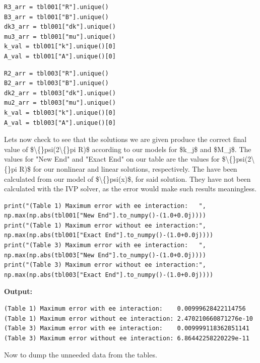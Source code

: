 \documentclass{article}
\begin{document}
\begin{lstlisting}
R3_arr = tbl001["R"].unique()
B3_arr = tbl001["B"].unique()
dk3_arr = tbl001["dk"].unique()
mu3_arr = tbl001["mu"].unique()
k_val = tbl001["k"].unique()[0]
A_val = tbl001["A"].unique()[0]\end{lstlisting}

\begin{lstlisting}
R2_arr = tbl003["R"].unique()
B2_arr = tbl003["B"].unique()
dk2_arr = tbl003["dk"].unique()
mu2_arr = tbl003["mu"].unique()
k_val = tbl003["k"].unique()[0]
A_val = tbl003["A"].unique()[0]\end{lstlisting}

Lets now check to see that the solutions we are given produce the correct final value of \$\textbackslash\{\}psi(2\textbackslash\{\}pi R)\$ according to our models for \$k\_j\$ and \$M\_j\$. The values for "New End" and "Exact End" on our table are the values for \$\textbackslash\{\}psi(2\textbackslash\{\}pi R)\$ for our nonlinear and linear solutions, respectively. The have been calculated from our model of \$\textbackslash\{\}psi(x)\$, for said solution. They have not been calculated with the IVP solver, as the error would make such results meaningless. 

\begin{lstlisting}
print("(Table 1) Maximum error with ee interaction:   ", np.max(np.abs(tbl001["New End"].to_numpy()-(1.0+0.0j))))
print("(Table 1) Maximum error without ee interaction:", np.max(np.abs(tbl001["Exact End"].to_numpy()-(1.0+0.0j))))
print("(Table 3) Maximum error with ee interaction:   ", np.max(np.abs(tbl003["New End"].to_numpy()-(1.0+0.0j))))
print("(Table 3) Maximum error without ee interaction:", np.max(np.abs(tbl003["Exact End"].to_numpy()-(1.0+0.0j))))\end{lstlisting}

\textbf{Output:}\begin{verbatim}
(Table 1) Maximum error with ee interaction:    0.00999628422114756
(Table 1) Maximum error without ee interaction: 2.470210660871276e-10
(Table 3) Maximum error with ee interaction:    0.009999118362851141
(Table 3) Maximum error without ee interaction: 6.86442258220229e-11

\end{verbatim}

Now to dump the unneeded data from the tables.
\end{document}

